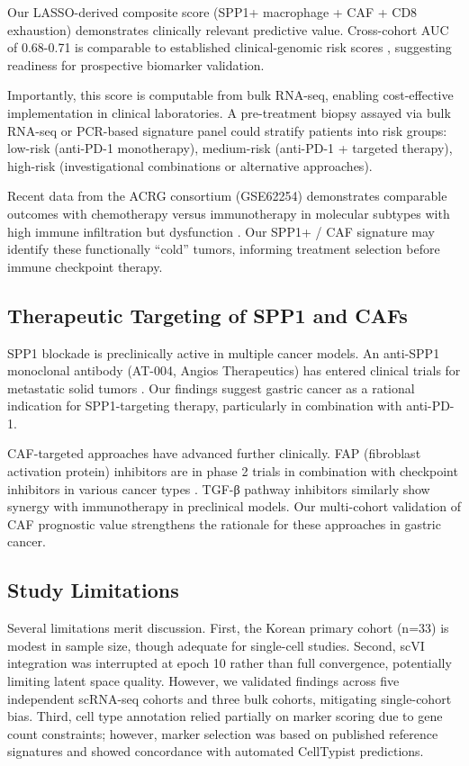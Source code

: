 \documentclass[12pt,twoside]{article}
\begin{document}
Our LASSO-derived composite score (SPP1+ macrophage + CAF + CD8 exhaustion) demonstrates clinically relevant predictive value. Cross-cohort AUC of 0.68-0.71 is comparable to established clinical-genomic risk scores \cite{Yoshihara2013}, suggesting readiness for prospective biomarker validation.

Importantly, this score is computable from bulk RNA-seq, enabling cost-effective implementation in clinical laboratories. A pre-treatment biopsy assayed via bulk RNA-seq or PCR-based signature panel could stratify patients into risk groups: low-risk (anti-PD-1 monotherapy), medium-risk (anti-PD-1 + targeted therapy), high-risk (investigational combinations or alternative approaches).

Recent data from the ACRG consortium (GSE62254) demonstrates comparable outcomes with chemotherapy versus immunotherapy in molecular subtypes with high immune infiltration but dysfunction \cite{Kim2019}. Our SPP1+ / CAF signature may identify these functionally ``cold'' tumors, informing treatment selection before immune checkpoint therapy.

\subsection{Therapeutic Targeting of SPP1 and CAFs}

SPP1 blockade is preclinically active in multiple cancer models. An anti-SPP1 monoclonal antibody (AT-004, Angios Therapeutics) has entered clinical trials for metastatic solid tumors \cite{ClinicalTrials2024}. Our findings suggest gastric cancer as a rational indication for SPP1-targeting therapy, particularly in combination with anti-PD-1.

CAF-targeted approaches have advanced further clinically. FAP (fibroblast activation protein) inhibitors are in phase 2 trials in combination with checkpoint inhibitors in various cancer types \cite{Sahai2020}. TGF-β pathway inhibitors similarly show synergy with immunotherapy in preclinical models. Our multi-cohort validation of CAF prognostic value strengthens the rationale for these approaches in gastric cancer.

\subsection{Study Limitations}

Several limitations merit discussion. First, the Korean primary cohort (n=33) is modest in sample size, though adequate for single-cell studies. Second, scVI integration was interrupted at epoch 10 rather than full convergence, potentially limiting latent space quality. However, we validated findings across five independent scRNA-seq cohorts and three bulk cohorts, mitigating single-cohort bias. Third, cell type annotation relied partially on marker scoring due to gene count constraints; however, marker selection was based on published reference signatures and showed concordance with automated CellTypist predictions.
\end{document}

